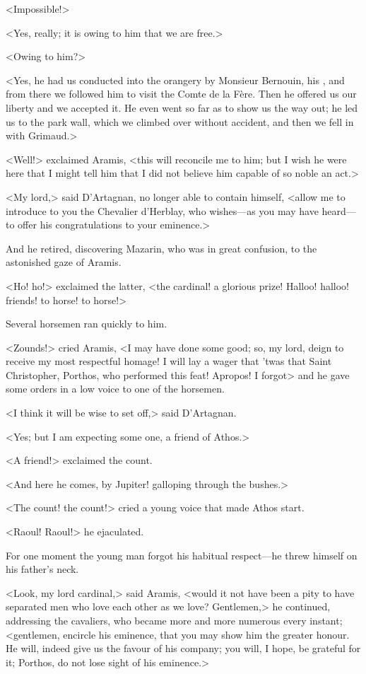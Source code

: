 <Impossible!>

<Yes, really; it is owing to him that we are free.>

<Owing to him?>

<Yes, he had us conducted into the orangery by Monsieur Bernouin, his , and from there we followed him to visit the Comte de la Fère. Then he offered us our liberty and we accepted it. He even went so far as to show us the way out; he led us to the park wall, which we climbed over without accident, and then we fell in with Grimaud.>

<Well!> exclaimed Aramis, <this will reconcile me to him; but I wish he were here that I might tell him that I did not believe him capable of so noble an act.>

<My lord,> said D'Artagnan, no longer able to contain himself, <allow me to introduce to you the Chevalier d'Herblay, who wishes—as you may have heard—to offer his congratulations to your eminence.>

And he retired, discovering Mazarin, who was in great confusion, to the astonished gaze of Aramis.

<Ho! ho!> exclaimed the latter, <the cardinal! a glorious prize! Halloo! halloo! friends! to horse! to horse!>

Several horsemen ran quickly to him.

<Zounds!> cried Aramis, <I may have done some good; so, my lord, deign to receive my most respectful homage! I will lay a wager that 'twas that Saint Christopher, Porthos, who performed this feat! Apropos! I forgot\longdash> and he gave some orders in a low voice to one of the horsemen.

<I think it will be wise to set off,> said D'Artagnan.

<Yes; but I am expecting some one, a friend of Athos.>

<A friend!> exclaimed the count.

<And here he comes, by Jupiter! galloping through the bushes.>

<The count! the count!> cried a young voice that made Athos start.

<Raoul! Raoul!> he ejaculated.

For one moment the young man forgot his habitual respect—he threw himself on his father's neck.

<Look, my lord cardinal,> said Aramis, <would it not have been a pity to have separated men who love each other as we love? Gentlemen,> he continued, addressing the cavaliers, who became more and more numerous every instant; <gentlemen, encircle his eminence, that you may show him the greater honour. He will, indeed give us the favour of his company; you will, I hope, be grateful for it; Porthos, do not lose sight of his eminence.>

